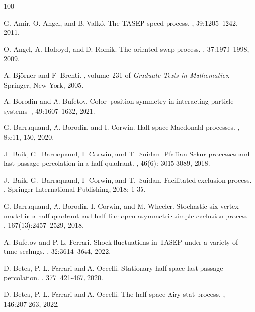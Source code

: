 \documentclass[12pt,a4paper]{amsart}
\theoremstyle{remark}
\numberwithin{equation}{section} \numberwithin{theorem}{section}
\begin{document}
\begin{thebibliography}{100}

 G. Amir, O. Angel, and B. Valkó.
\newblock The TASEP speed process. 
, 39:1205–1242, 2011.

O. Angel, A. Holroyd, and D. Romik.
\newblock The oriented swap process.
, 37:1970–1998, 2009.

A. Björner and F. Brenti. 
, volume~231 of {\em Graduate Texts in Mathematics}.
\newblock Springer, New York, 2005.

A. Borodin and A. Bufetov.
\newblock Color--position symmetry in interacting particle systems.
, 49:1607–1632, 2021.

 G. Barraquand, A. Borodin, and I. Corwin. 
\newblock Half-space Macdonald processes.
, 8:e11, 150, 2020.

J.~Baik, G.~Barraquand, I.~Corwin, and T.~Suidan.
\newblock Pfaffian Schur processes and last passage percolation in a half-quadrant.
, 46(6): 3015-3089, 2018.

J.~Baik, G.~Barraquand, I.~Corwin, and T.~Suidan.
\newblock Facilitated exclusion process.
, Springer International Publishing, 2018: 1-35.

G. Barraquand, A. Borodin, I. Corwin, and M. Wheeler. 
\newblock Stochastic six-vertex model in a half-quadrant and half-line open asymmetric simple exclusion process.
, 167(13):2457–2529, 2018.

A. Bufetov and P. L. Ferrari.
\newblock Shock fluctuations in TASEP under a variety of time scalings.
,  32:3614–3644, 2022.

D. Betea, P. L. Ferrari and A. Occelli.
\newblock Stationary half-space last passage percolation.
,  377: 421-467, 2020.

D. Betea, P. L. Ferrari and A. Occelli.
\newblock The half-space Airy stat process.
,  146:207-263, 2022.


\end{thebibliography}
\end{document}
